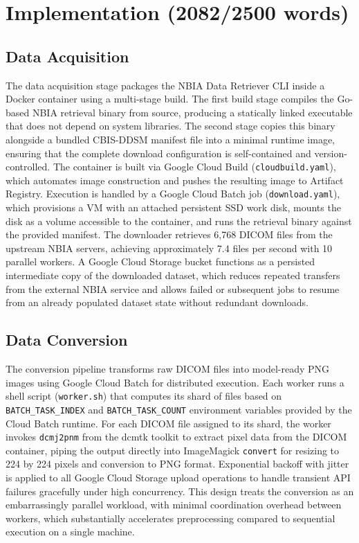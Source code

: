 \documentclass[justified,notoc,openany]{tufte-book}
\begin{document}
\newpage

\chapter{Implementation (2082/2500 words)}\label{implementation-20822500-words}

\section{Data Acquisition}\label{data-acquisition}

The data acquisition stage packages the NBIA Data Retriever CLI inside a Docker container using a multi-stage build. The first build stage compiles the Go-based NBIA retrieval binary from source, producing a statically linked executable that does not depend on system libraries. The second stage copies this binary alongside a bundled CBIS-DDSM manifest file into a minimal runtime image, ensuring that the complete download configuration is self-contained and version-controlled. The container is built via Google Cloud Build (\texttt{cloudbuild.yaml}), which automates image construction and pushes the resulting image to Artifact Registry. Execution is handled by a Google Cloud Batch job (\texttt{download.yaml}), which provisions a VM with an attached persistent SSD work disk, mounts the disk as a volume accessible to the container, and runs the retrieval binary against the provided manifest. The downloader retrieves 6,768 DICOM files from the upstream NBIA servers, achieving approximately 7.4 files per second with 10 parallel workers. A Google Cloud Storage bucket functions as a persisted intermediate copy of the downloaded dataset, which reduces repeated transfers from the external NBIA service and allows failed or subsequent jobs to resume from an already populated dataset state without redundant downloads.

\section{Data Conversion}\label{data-conversion}

The conversion pipeline transforms raw DICOM files into model-ready PNG images using Google Cloud Batch for distributed execution. Each worker runs a shell script (\texttt{worker.sh}) that computes its shard of files based on \texttt{BATCH\_TASK\_INDEX} and \texttt{BATCH\_TASK\_COUNT} environment variables provided by the Cloud Batch runtime. For each DICOM file assigned to its shard, the worker invokes \texttt{dcmj2pnm} from the dcmtk toolkit to extract pixel data from the DICOM container, piping the output directly into ImageMagick \texttt{convert} for resizing to 224 by 224 pixels and conversion to PNG format. Exponential backoff with jitter is applied to all Google Cloud Storage upload operations to handle transient API failures gracefully under high concurrency. This design treats the conversion as an embarrassingly parallel workload, with minimal coordination overhead between workers, which substantially accelerates preprocessing compared to sequential execution on a single machine.
\end{document}
